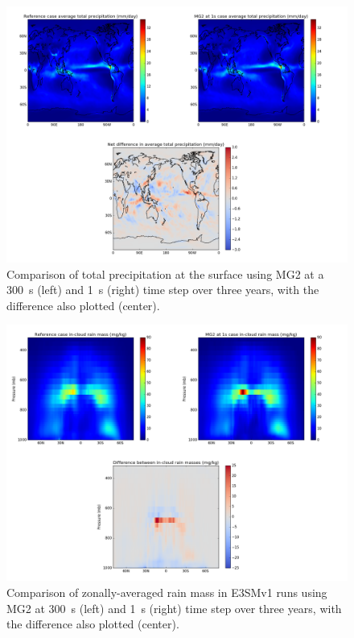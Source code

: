 \documentclass [11pt, proquest] {uwthesis}[2020/02/24]
\begin{document}
\begin{figure}[htbp]
  \includegraphics[width=6.5in]{./MG2Figure13.png}
  \caption[Comparison of total surface precipitation in EAMv1 simulations with different MG2 substep sizes]{Comparison of total precipitation at the surface using MG2 at a \SI{300}{\second} (left) and \SI{1}{\second} (right) time step over three years, with the difference also plotted (center).}
  \label{e3sm-prect-comparison}
\end{figure}

\begin{figure}[htbp]
  \includegraphics[width=6.5in]{./MG2Figure14.png}
  \caption[Comparison of zonally-averaged rain mass in EAMv1 simulations with different MG2 substep sizes]{Comparison of zonally-averaged rain mass in E3SMv1 runs using MG2 at \SI{300}{\second} (left) and \SI{1}{\second} (right) time step over three years, with the difference also plotted (center).}
  \label{e3sm-rain-comparison}
\end{figure}
\end{document}
